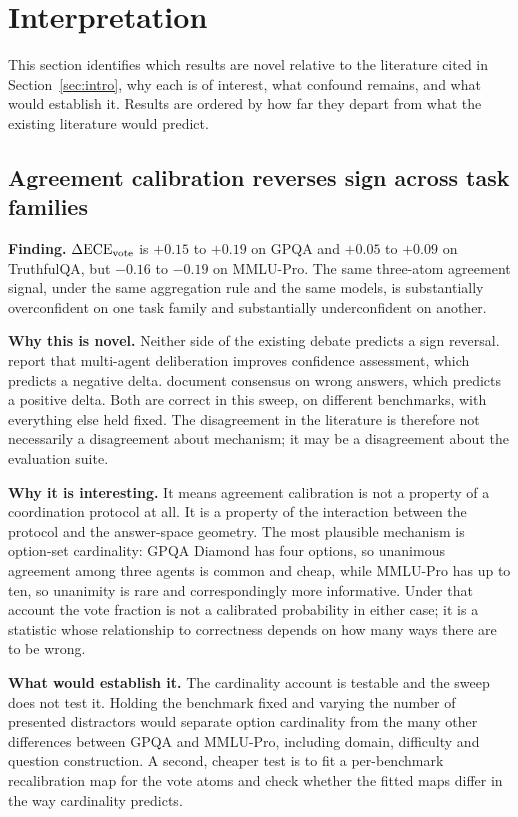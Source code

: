 \section{Interpretation}
\label{sec:interpretation}

This section identifies which results are novel relative to the literature cited in
Section~\ref{sec:intro}, why each is of interest, what confound remains, and what would
establish it. Results are ordered by how far they depart from what the existing literature
would predict.

\subsection{Agreement calibration reverses sign across task families}

\textbf{Finding.} $\Delta\mathrm{ECE}_{\mathrm{vote}}$ is $+0.15$ to $+0.19$ on GPQA and $+0.05$ to $+0.09$ on
TruthfulQA, but $-0.16$ to $-0.19$ on MMLU-Pro. The same three-atom agreement signal, under
the same aggregation rule and the same models, is substantially overconfident on one task
family and substantially underconfident on another.

\textbf{Why this is novel.} Neither side of the existing debate predicts a sign reversal.
\citet{yang2024collaborative} report that multi-agent deliberation improves confidence
assessment, which predicts a negative delta. \citet{wynn2025debate} document
consensus on wrong answers, which predicts a positive delta. Both are correct in this
sweep, on different benchmarks, with everything else held fixed. The disagreement in the
literature is therefore not necessarily a disagreement about mechanism; it may be a
disagreement about the evaluation suite.

\textbf{Why it is interesting.} It means agreement calibration is not a property of a
coordination protocol at all. It is a property of the interaction between the protocol and
the answer-space geometry. The most plausible mechanism is option-set cardinality: GPQA
Diamond has four options, so unanimous agreement among three agents is common and cheap,
while MMLU-Pro has up to ten, so unanimity is rare and correspondingly more informative.
Under that account the vote fraction is not a calibrated probability in either case; it is
a statistic whose relationship to correctness depends on how many ways there are to be
wrong.

\textbf{What would establish it.} The cardinality account is testable and the sweep does not
test it. Holding the benchmark fixed and varying the number of presented distractors would
separate option cardinality from the many other differences between GPQA and MMLU-Pro,
including domain, difficulty and question construction. A second, cheaper test is to fit a
per-benchmark recalibration map for the vote atoms and check whether the fitted maps differ
in the way cardinality predicts.

